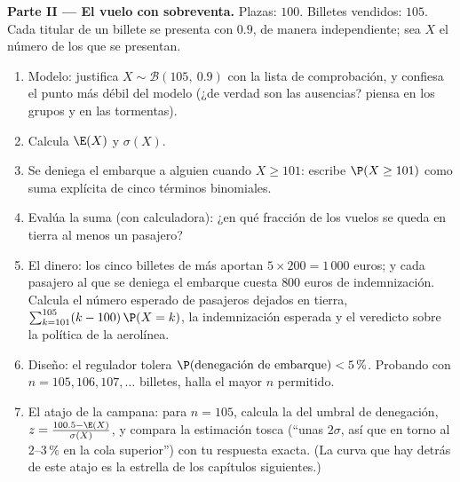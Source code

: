 \begin{problem}
\medskip
\noindent\textbf{Parte II --- El vuelo con sobreventa.}
Plazas: $100$. Billetes vendidos: $105$. Cada titular de un billete se
presenta con  $0.9$, de manera independiente; sea $X$ el número
de los que se presentan.
\begin{enumerate}[resume]
  \item Modelo: justifica $X \sim \mathcal B(105,\ 0.9)$ con la lista de
        comprobación, y confiesa el punto más débil del modelo (¿de verdad
        son  las ausencias? piensa en los grupos y en las
        tormentas).
  \item Calcula $\E(X)$ y $\sigma(X)$.
  \item Se deniega el embarque a alguien cuando $X \geq 101$: escribe
        $\P(X \geq 101)$ como suma explícita de cinco términos binomiales.
  \item Evalúa la suma (con calculadora): ¿en qué fracción de los vuelos se
        queda en tierra al menos un pasajero?
  \item El dinero: los cinco billetes de más aportan
        $5 \times 200 = 1\,000$ euros; y cada pasajero al que se deniega el
        embarque cuesta $800$ euros de indemnización. Calcula el número
        esperado de pasajeros dejados en tierra,
        $\sum_{k=101}^{105} (k - 100)\,\P(X = k)$, la indemnización
        esperada y el veredicto sobre la política de la aerolínea.
  \item Diseño: el regulador tolera
        $\P(\text{denegación de embarque}) < 5\,\%$. Probando con
        $n = 105, 106, 107, \dots$ billetes, halla el mayor $n$ permitido.
  \item El atajo de la campana: para $n = 105$, calcula la  del
        umbral de denegación, $z = \frac{100.5 - \E(X)}{\sigma(X)}$, y
        compara la estimación tosca (``unas $2\sigma$, así que en torno al
        $2$--$3\,\%$ en la cola superior'') con tu respuesta exacta. (La
        curva que hay detrás de este atajo es la estrella de los capítulos
        siguientes.)
\end{enumerate}


\end{problem}
